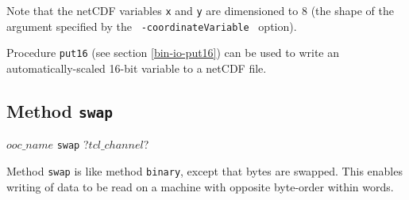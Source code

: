 Note that the netCDF variables \texttt{x} and \texttt{y} 
are dimensioned to 8 (the shape of the argument
  specified by the 
  \mbox{
    \texttt{-coordinateVariable}
  } option).
  
Procedure \texttt{put16}
(see section  \ref{bin-io-put16})
can be used to write an automatically-scaled 16-bit variable to
  a netCDF file.

\subsection{Method \texttt{swap}}
    \label{ooc-write-swap}

  $ooc\_name$ \texttt{swap} ?$tcl\_channel$?

Method 
  \texttt{swap} is like method 
  \texttt{binary}, except that bytes are swapped. This enables
  writing of data to be read on a machine with opposite byte-order
  within words.
